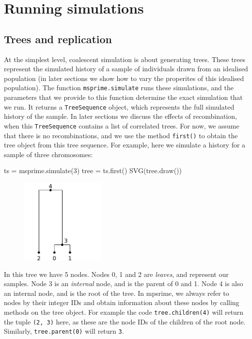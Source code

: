 \documentclass[graybox]{svmult}
\begin{document}
\section{Running simulations}
\label{sec:simulations}


\subsection{Trees and replication}\label{running-simulations}
    At the simplest level, coalescent simulation is about generating trees.
These trees represent the simulated history of a sample of individuals
drawn from an idealised population (in later sections we show how to
vary the properites of this idealised population). The function
\texttt{msprime.simulate} runs these simulations, and the parameters
that we provide to this function determine the exact simulation that we
run. It returns a \texttt{TreeSequence} object, which represents the
full simulated history of the sample. In later sections we discuss the
effects of recombination, when this \texttt{TreeSequence} contains a
list of correlated trees. For now, we assume that there is no
recombinations, and we use the method \texttt{first()} to obtain the
tree object from this tree sequence. For example, here we simulate a
history for a sample of three chromosomes:

\begin{pythoncode}
ts = msprime.simulate(3)
tree = ts.first()
SVG(tree.draw())
\end{pythoncode}

\begin{figure}
  \begin{center}
    \includegraphics[width=0.38\textwidth]{images/simulations_5_0}
  \end{center}
\end{figure}

    In this tree we have 5 nodes. Nodes 0, 1 and 2 are \emph{leaves}, and
represent our samples. Node 3 is an \emph{internal} node, and is the
parent of 0 and 1. Node 4 is also an internal node, and is the root of
the tree. In mpsrime, we always refer to nodes by their integer IDs and
obtain information about these nodes by calling methods on the tree
object. For example the code \texttt{tree.children(4)} will return the
tuple \texttt{(2,\ 3)} here, as these are the node IDs of the children
of the root node. Similarly, \texttt{tree.parent(0)} will return
\texttt{3}.
\end{document}
